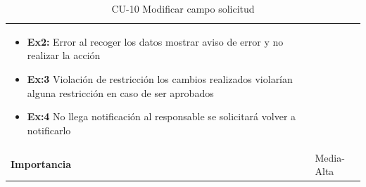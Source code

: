 \begin{table}[p]
\begin{tabularx}{\linewidth}{ p{} p{} }
\begin{itemize}
			\item \textbf{Ex2:} Error al recoger los datos \textrightarrow{} mostrar aviso de error y no realizar la acción
			\item \textbf{Ex:3} Violación de restricción \textrightarrow{} los cambios realizados violarían alguna restricción en caso de ser aprobados
			\item \textbf{Ex:4} No llega notificación al responsable \textrightarrow{} se solicitará volver a notificarlo
		\end{itemize}\\
		\textbf{Importancia}          & Media-Alta \\
		\bottomrule
	\end{tabularx}
	\caption{CU-10 Modificar campo solicitud}
\end{table}

